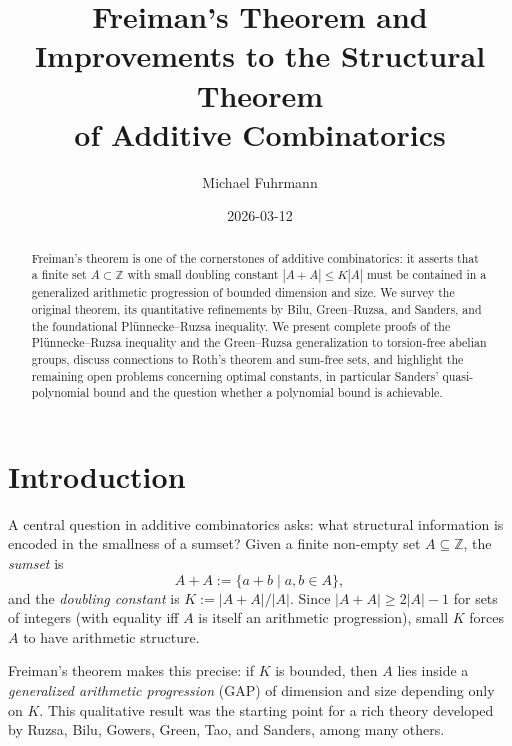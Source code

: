 \documentclass[12pt,a4paper]{amsart}
\theoremstyle{definition}
\theoremstyle{remark}
\newcommand{\Z}{\mathbb{Z}}
\begin{document}
\begin{abstract}
Freiman's theorem is one of the cornerstones of additive combinatorics: it asserts
that a finite set $A \subset \Z$ with small doubling constant $|A+A| \leq K|A|$
must be contained in a generalized arithmetic progression of bounded dimension and
size. We survey the original theorem, its quantitative refinements by
Bilu, Green--Ruzsa, and Sanders, and the foundational Plünnecke--Ruzsa
inequality. We present complete proofs of the Plünnecke--Ruzsa inequality and the
Green--Ruzsa generalization to torsion-free abelian groups, discuss connections to
Roth's theorem and sum-free sets, and highlight the remaining open problems
concerning optimal constants, in particular Sanders' quasi-polynomial bound and
the question whether a polynomial bound is achievable.
\end{abstract}

\title{Freiman's Theorem and Improvements to the Structural Theorem\\
of Additive Combinatorics}

\author{Michael Fuhrmann}
\address{Specialist Mathematics Project, Build 164}
\date{2026-03-12}

\maketitle

\tableofcontents

\section{Introduction}

A central question in additive combinatorics asks: what structural information
is encoded in the smallness of a sumset? Given a finite non-empty set
$A \subseteq \Z$, the \emph{sumset} is
\[
  A + A := \{a + b \mid a, b \in A\},
\]
and the \emph{doubling constant} is $K := |A + A|/|A|$. Since
$|A + A| \geq 2|A| - 1$ for sets of integers (with equality iff $A$ is itself an
arithmetic progression), small $K$ forces $A$ to have arithmetic structure.

Freiman's theorem \cite{Freiman1966} makes this precise: if $K$ is bounded, then
$A$ lies inside a \emph{generalized arithmetic progression} (GAP) of dimension and
size depending only on $K$. This qualitative result was the starting point for a
rich theory developed by Ruzsa, Bilu, Gowers, Green, Tao, and Sanders, among many
others.
\end{document}
